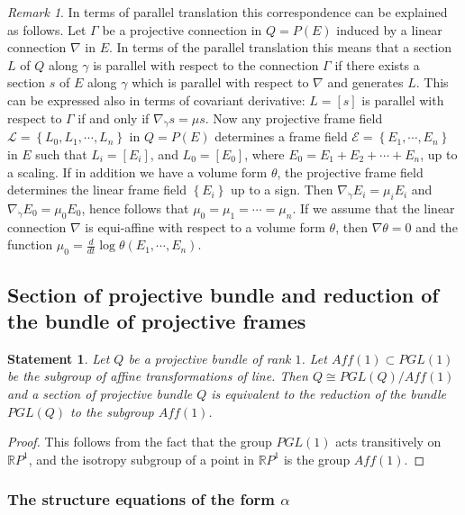 \documentclass[12pt,letterpaper]{amsart}
\theoremstyle{definition}
\theoremstyle{plain}
\newtheorem{stat}{Statement}
\theoremstyle{remark}
\newtheorem{rem}{Remark}
\begin{document}
\begin{rem}
In terms of parallel translation this correspondence can be explained as follows.
Let $\Gamma$ be a projective connection in $Q = P(E)$ induced by a linear connection $\nabla$ in $E$.
In terms of the parallel translation this means that a section $L$ of $Q$ along $\gamma$ is parallel with respect to the connection $\Gamma$ if there exists a section $s$ of $E$ along $\gamma$ which is parallel with respect to $\nabla$ and generates $L$.
This can be expressed also in terms of covariant derivative: $L = [ s ]$ is parallel with respect to $\Gamma$ if and only if $\nabla_{\dot\gamma} s = \mu s$.
Now any projective frame field $\mathcal{L} = \left\{ L_0, L_1, \cdots, L_n \right\}$ in $Q = P(E)$ determines a frame field $\mathcal{E} = \left\{E_1, \cdots, E_n\right\}$ in $E$ such that $L_i = [ E_i ]$, and $L_0 = [ E_0 ]$, where $E_0 = E_1 + E_2 + \cdots + E_n$, up to a scaling.
If in addition we have a volume form $\theta$, the projective frame field determines the linear frame field $\left\{ E_i \right\}$ up to a sign.
Then $\nabla_{\dot\gamma} E_i = \mu_i E_i$ and $\nabla_{\dot\gamma} E_0 = \mu_0 E_0$, hence follows that $\mu_0 = \mu_1 = \cdots = \mu_n$.
If we assume that the linear connection $\nabla$ is equi-affine with respect to a volume form $\theta$, then $\nabla \theta = 0$ and the function $\mu_0 = \frac{d}{dt} \log \theta(E_1, \cdots, E_n)$.
\label{rem:8}
\end{rem}
\subsection{Section of projective bundle and reduction of the bundle of projective frames}
\label{subsec:4_3}
\begin{stat}
Let $Q$ be a projective bundle of rank $1$.
Let $Aff(1) \subset PGL(1)$ be the subgroup of affine transformations of line.
Then $Q \cong PGL(Q)/Aff(1)$ and a section of projective bundle $Q$ is equivalent to the reduction of the bundle $PGL(Q)$ to the subgroup $Aff(1)$.
\label{stat:9}
\end{stat}
\begin{proof}
This follows from the fact that the group $PGL(1)$ acts transitively on $\mathbb{R}P^1$, and the isotropy subgroup of a point in $\mathbb{R}P^1$ is the group $Aff(1)$.
\end{proof}

\subsubsection{The structure equations of the form $\alpha$}
\label{subsubsec:4_3_1}
\end{document}
